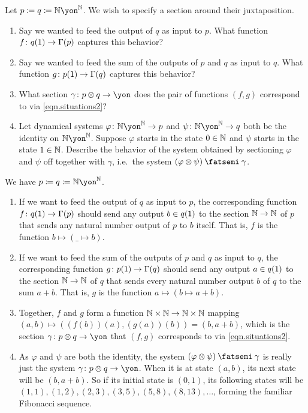 \documentclass[Book-Poly]{subfiles}
\begin{document}
\begin{exercise}
Let $p\coloneqq q\coloneqq\nn\yon^\nn$.
We wish to specify a section around their juxtaposition.
\begin{enumerate}
    \item Say we wanted to feed the output of $q$ as input to $p$.
    What function $f\colon q(\textsf{1})\to\Gamma(p)$ captures this behavior?
    \item Say we wanted to feed the sum of the outputs of $p$ and $q$ as input to $q$.
    What function $g\colon p(\textsf{1})\to\Gamma(q)$ captures this behavior?
    \item What section $\gamma\colon p\otimes q\to\yon$ does the pair of functions $(f,g)$ correspond to via \eqref{eqn.situations2}?
	\item Let dynamical systems $\varphi\colon\nn\yon^\nn\to p$ and $\psi\colon\nn\yon^\nn\to q$ both be the identity on $\nn\yon^\nn$.
	Suppose $\varphi$ starts in the state $0\in\mathbb{N}$ and $\psi$ starts in the state $1\in\mathbb{N}$.
	Describe the behavior of the system obtained by sectioning $\varphi$ and $\psi$ off together with $\gamma$, i.e.\ the system $(\varphi\otimes\psi)\then\gamma$.
\qedhere
\end{enumerate}
\begin{solution}
We have $p\coloneqq q\coloneqq\nn\yon^\nn$.
\begin{enumerate}
    \item If we want to feed the output of $q$ as input to $p$, the corresponding function $f\colon q(\textsf{1})\to\Gamma(p)$ should send any output $b\in q(\textsf{1})$ to the section $\mathbb{N}\to\mathbb{N}$ of $p$ that sends any natural number output of $p$ to $b$ itself.
    That is, $f$ is the function $b\mapsto(\_\mapsto b)$.
    \item If we want to feed the sum of the outputs of $p$ and $q$ as input to $q$, the corresponding function $g\colon p(\textsf{1})\to\Gamma(q)$ should send any output $a\in q(\textsf{1})$ to the section $\mathbb{N}\to\mathbb{N}$ of $q$ that sends every natural number output $b$ of $q$ to the sum $a+b$.
    That is, $g$ is the function $a\mapsto(b\mapsto a+b)$.
    \item Together, $f$ and $g$ form a function $\mathbb{N}\times\mathbb{N}\to\mathbb{N}\times\mathbb{N}$ mapping $(a,b)\mapsto((f(b))(a),(g(a))(b))=(b,a+b)$, which is the section $\gamma\colon p\otimes q\to\yon$ that $(f,g)$ corresponds to via \eqref{eqn.situations2}.
    \item As $\varphi$ and $\psi$ are both the identity, the system $(\varphi\otimes\psi)\then\gamma$ is really just the system $\gamma\colon p\otimes q\to\yon$.
    When it is at state $(a,b)$, its next state will be $(b,a+b)$.
    So if its initial state is $(0,1)$, its following states will be $(1,1),(1,2),(2,3),(3,5),(5,8),(8,13),\ldots$, forming the familiar Fibonacci sequence.
\end{enumerate}
\end{solution}
\end{exercise}
\end{document}

